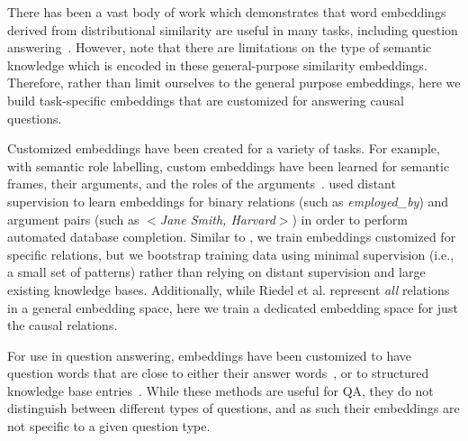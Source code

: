 There has been a vast body of work which demonstrates that word embeddings derived from distributional similarity are useful in many tasks, including question answering~\mbox{\citep[see \emph{inter alia}][]{fried2015higher,yih13}}.  However, \citet{levy2015supervised} note that there are limitations on the type of semantic knowledge which is encoded in these general-purpose similarity embeddings.  Therefore, rather than limit ourselves to the general purpose embeddings, here we build task-specific embeddings that are customized for answering causal questions.

Customized embeddings have been created for a variety of tasks. %
For example, with semantic role labelling, custom embeddings have been learned for semantic frames, their arguments, and the roles of the arguments~\citep[e.g.,][]{fitzgerald2015semantic,woodsenddistributed}.  \citet{riedel2013relation} used distant supervision to learn embeddings for binary relations (such as \textit{employed\_by}) and argument pairs (such as $<$\textit{Jane Smith, Harvard}$>$) in order to perform automated database completion.  
Similar to \citeauthor{riedel2013relation}, we train embeddings customized for specific relations, but we bootstrap training data using minimal supervision (i.e., a small set of patterns) rather than relying on distant supervision and large existing knowledge bases.  Additionally, while Riedel et al. represent \textit{all} relations in a general embedding space, here we train a dedicated embedding space for just the causal relations. 

For use in question answering, embeddings have been customized to have question words that are close to either their answer words~\citep{bordes2014question}, or to structured knowledge base entries~\citep{yang2014joint}.  While these methods are useful for QA, they do not distinguish between different types of questions, and as such their embeddings are not specific to a given question type.

